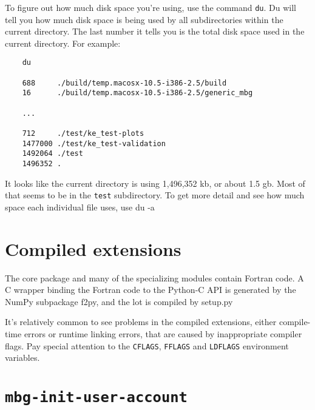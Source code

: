 {\begin{itemize}
    To figure out how much disk space you're using, use the command \texttt{du}. Du will tell you how much disk space is being used by all subdirectories within the current directory. The last number it tells you is the total disk space used in the current directory. For example:

    \begin{verbatim}
    du 

    688     ./build/temp.macosx-10.5-i386-2.5/build
    16      ./build/temp.macosx-10.5-i386-2.5/generic_mbg

    ...

    712     ./test/ke_test-plots
    1477000 ./test/ke_test-validation
    1492064 ./test
    1496352 .    
    \end{verbatim}

    It looks like the current directory is using 1,496,352 kb, or about 1.5 gb. Most of that seems to be in the \texttt{test} subdirectory. To get more detail and see how much space each individual file uses, use du -a
\end{itemize}
}

\section{Compiled extensions}

The core package and many of the specializing modules contain Fortran code. A C wrapper binding the Fortran code to the Python-C API is generated by the NumPy subpackage f2py, and the lot is compiled by setup.py

It's relatively common to see problems in the compiled extensions, either compile-time errors or runtime linking errors, that are caused by inappropriate compiler flags. Pay special attention to the \texttt{CFLAGS}, \texttt{FFLAGS} and \texttt{LDFLAGS} environment variables.

\section{\texttt{mbg-init-user-account}}

